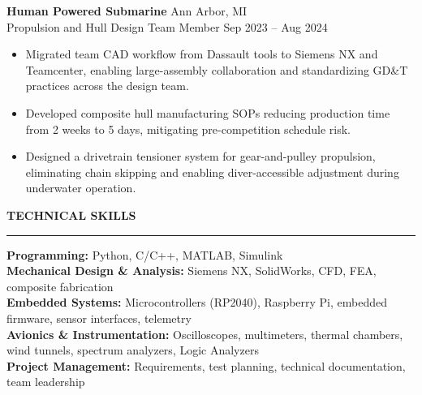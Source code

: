 \documentclass[10pt]{article}
\newcommand{\ressection}[1]{
  \vspace{0.25em}
  {\large\bfseries #1}\par
  \vspace{0.08em}\hrule\vspace{0.20em}
}
\begin{document}
{\bfseries Human Powered Submarine} \hfill Ann Arbor, MI \\
Propulsion and Hull Design Team Member \hfill Sep 2023 -- Aug 2024
\begin{itemize}
  \item Migrated team CAD workflow from Dassault tools to Siemens NX and Teamcenter, enabling large-assembly collaboration and standardizing GD\&T practices across the design team.
  \item Developed composite hull manufacturing SOPs reducing production time from 2 weeks to 5 days, mitigating pre-competition schedule risk.
  \item Designed a drivetrain tensioner system for gear-and-pulley propulsion, eliminating chain skipping and enabling diver-accessible adjustment during underwater operation.
\end{itemize}

\ressection{TECHNICAL SKILLS}

\textbf{Programming:} Python, C/C++, MATLAB, Simulink \\
\textbf{Mechanical Design \& Analysis:} Siemens NX, SolidWorks, CFD, FEA, composite fabrication \\
\textbf{Embedded Systems:} Microcontrollers (RP2040), Raspberry Pi, embedded firmware, sensor interfaces, telemetry \\
\textbf{Avionics \& Instrumentation:} Oscilloscopes, multimeters, thermal chambers, wind tunnels, spectrum analyzers, Logic Analyzers \\
\textbf{Project Management:} Requirements, test planning, technical documentation, team leadership
\end{document}
